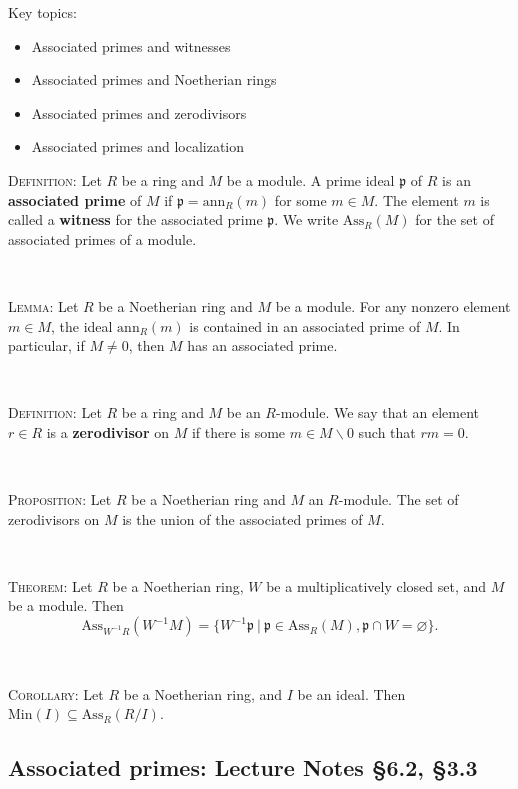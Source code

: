 \documentclass[12pt]{amsart}
\newcommand{\p}{\mathfrak{p}}
\newcommand{\Ass}{\mathrm{Ass}}
\newcommand{\Min}{\mathrm{Min}}
\newcommand{\ann}{\mathrm{ann}}
\newcommand{\0}{$\phantom{.}$}
\newcommand{\1}{\mathbbm{1}}
\begin{document}
  \begin{framed} Key topics:
\begin{itemize}
\item Associated primes and witnesses
\item Associated primes and Noetherian rings
\item Associated primes and zerodivisors
\item Associated primes and localization
\end{itemize}
\end{framed}





\noindent \textsc{Definition:} Let $R$ be a ring and $M$ be a module. A prime ideal $\p$ of $R$ is an \textbf{associated prime} of $M$ if $\p = \ann_R(m)$ for some $m\in M$. The element $m$ is called a \textbf{witness} for the associated prime $\p$. We write $\Ass_R(M)$ for the set of associated primes of a module.

\

\noindent \textsc{Lemma:} Let $R$ be a Noetherian ring and $M$ be a module. 
For any nonzero element $m\in M$, the ideal $\ann_R(m)$ is contained in an associated prime of $M$. In particular, if $M\neq 0$, then $M$ has an associated prime.

\

\noindent \textsc{Definition:} Let $R$ be a ring and $M$ be an $R$-module. We say that an element $r\in R$ is a \textbf{zerodivisor} on $M$ if there is some $m \in M\smallsetminus 0$ such that $rm = 0$.

\

\noindent \textsc{Proposition:} Let $R$ be a Noetherian ring and $M$ an $R$-module. The set of zerodivisors on $M$ is the union of the associated primes of $M$.

\

\noindent \textsc{Theorem:} Let $R$ be a Noetherian ring, $W$ be a multiplicatively closed set, and $M$ be a module. Then
\[ \Ass_{W^{-1}R}(W^{-1}M) = \{ W^{-1}\p \ | \ \p\in \Ass_R(M), \p\cap W=\varnothing\}.\]

\

\noindent \textsc{Corollary:} Let $R$ be a Noetherian ring, and $I$ be an ideal. Then $\Min(I) \subseteq \Ass_R(R/I)$.


\newpage

\subsection{Associated primes: Lecture Notes \S6.2, \S3.3}\0
 
\end{document}
